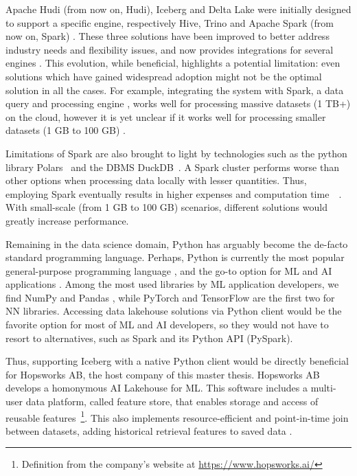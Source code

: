 Apache Hudi (from now on, Hudi), Iceberg and Delta Lake were initially designed to support a specific engine, respectively Hive, Trino and Apache Spark (from now on, Spark) \cite{ApacheHudiVs}. These three solutions have been improved to better address industry needs and flexibility issues, and now provides integrations for several engines \cite{OngoingEvolutionTableFormat}. This evolution, while beneficial, highlights a potential limitation: even solutions which have gained widespread adoption might not be the optimal solution in all the cases. For example, integrating the system with Spark, a data query and processing engine \cite{zahariaApacheSparkUnified2016}, works well for processing massive datasets (1 TB+) on the cloud, however it is yet unclear if it works well for processing smaller datasets (1 GB to 100 GB) \cite{Khazanchi1801362}. 

Limitations of Spark are also brought to light by technologies such as the python library Polars~\cite{vinkWroteOneFastest2021} and the \gls{DBMS} DuckDB~\cite{raasveldtDuckDBEmbeddableAnalytical2019}. A Spark cluster performs worse than other options when processing data locally with lesser quantities. Thus, employing Spark eventually results in higher expenses and computation time~\cite{ebergenUpdatesH2OAi2023}~\cite{BenchmarkResultsSpark}. With small-scale (from 1 GB to 100 GB) scenarios, different solutions would greatly increase performance.

Remaining in the data science domain, Python has arguably become the de-facto standard programming language. Perhaps, Python is currently the most popular general-purpose programming language \cite{TIOBEIndex, StackOverflowDeveloper, PythonTopLanguage}, and the go-to option for \gls{ML} and \gls{AI} applications \cite{python-machine-learning}. Among the most used libraries by \gls{ML} application developers, we find NumPy and Pandas \cite{StackOverflowDeveloper}, while PyTorch and TensorFlow are the first two for \gls{NN} libraries. Accessing data lakehouse solutions via Python client would be the favorite option for most of \gls{ML} and \gls{AI} developers, so they would not have to resort to alternatives, such as Spark and its Python \gls{API} (PySpark). 

Thus, supporting Iceberg with a native Python client would be directly beneficial for Hopsworks \gls{AB}, the host company of this master thesis. Hopsworks \gls{AB} develops a homonymous \gls{AI} Lakehouse for \gls{ML}. This software includes a multi-user data platform, called feature store, that enables storage and access of reusable features~\footnote{Definition from the company's website at \url{https://www.hopsworks.ai/}}. This also implements resource-efficient and point-in-time join between datasets, adding historical retrieval features to saved data \cite{Pettersson1695672}.

